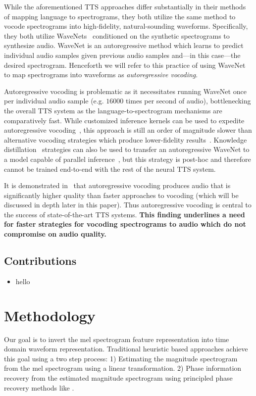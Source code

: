 \documentclass[a4paper]{article}
\begin{document}
While the aforementioned TTS approaches differ substantially in their methods of mapping language to spectrograms, they both utilize the same method to vocode spectrograms into high-fidelity, natural-sounding waveforms. 
Specifically, they both utilize WaveNets~\cite{oord2016wavenet} conditioned on the synthetic spectrograms to synthesize audio. 
WaveNet is an autoregressive method which learns to predict individual audio samples given previous audio samples and---in this case---the desired spectrogram. 
Henceforth we will refer to this practice of using WaveNet to map spectrograms into waveforms as \emph{autoregressive vocoding}. 

Autoregressive vocoding is problematic as it necessitates running WaveNet once per individual audio sample (e.g. $16000$ times per second of audio), bottlenecking the overall TTS system as the language-to-spectrogram mechanisms are comparatively fast. 
While customized inference kernels can be used to expedite autoregressive vocoding~\cite{arik2017deep}, this approach is still an order of magnitude slower than alternative vocoding strategies which produce lower-fidelity results~\cite{ping2017deep}. 
Knowledge distillation~\cite{hinton2015distilling} strategies can also be used to transfer an autoregressive WaveNet to a model capable of parallel inference~\cite{oord2017parallel}, 
but this strategy is post-hoc and therefore cannot be trained end-to-end with the rest of the neural TTS system.

It is demonstrated in~\cite{ping2017deep} that autoregressive vocoding produces audio that is significantly higher quality than faster approaches to vocoding (which will be discussed in depth later in this paper). 
Thus autoregressive vocoding is central to the success of state-of-the-art TTS systems.
\textbf{This finding underlines a need for faster strategies for vocoding spectrograms to audio which do not compromise on audio quality.}

\subsection{Contributions}

\begin{itemize}
    \item hello
\end{itemize}

\section{Methodology}
Our goal is to invert the mel spectrogram feature representation into time domain waveform representation. 
Traditional heuristic based approaches achieve this goal using a two step process:
1) Estimating the magnitude spectrogram from the mel spectrogram using a linear transformation.
2) Phase information recovery from the estimated magnitude spectrogram using principled phase recovery methods like \cite{lws}. 
   
\end{document}
